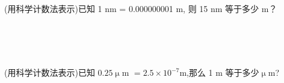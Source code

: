 \begin{comment}
    \item{
        化简: $(-a-b)^{2n}$ ($n$为整数).
    }
    \\ \\ \\
    \item{
        化简: $(-a-b)^{2n+1}$ ($n$为整数).
    }
    \\ \\ \\
\end{comment}

\item{
    (用科学计数法表示)已知 1 nm = 0.000000001 m, 则 15 nm 等于多少 m？
    \iffalse
    \fangsong\zihao{4}
    解答: 

    \textcircled{1} 写出换算关系
    \begin{align*}
        1 \rm{nm} &= 10^{-9} \rm{m}
    \end{align*}
    \textcircled{2} 两边同时乘15
    \begin{align*}
        15 \rm{nm} &= 15 \times 10^{-9} \rm{m}\\
        &= 1.5\times 10^{-8} \rm{m}.
    \end{align*}
    \fi
}
\\ \\ \\

\begin{comment}
    \item{
        (用科学计数法表示)肥皂泡表面厚度大约是 0.0007 mm,换算成以米为单位是多少？
        \iffalse
        \fangsong\zihao{4}
        解答: 

        \textcircled{1} 写出换算关系
        \begin{align*}
            1 \rm{mm} &= 10^{-3} \rm{m}
        \end{align*}
        \textcircled{2} 两边同时乘0.0007
        \begin{align*}
            0.0007 \rm{mm} &= 0.0007 \times 10^{-3} \rm{m}\\
            &= 7\times 10^{-7} \rm{m}.
        \end{align*}
        \fi
    }
    \\ \\ \\
\end{comment}

\item{
    (用科学计数法表示)已知 $0.25 \upmu$m $ = 2.5\times 10^{-7}$m,那么 1 m 等于多少$\upmu$m?
    \iffalse
    \fangsong\zihao{4}
    思路: 将题中给出的换算关系两边同时除以 $2.5\times 10^{-7}$,右边就出现了 1m.

    解答: 
    \begin{align*}
        \frac{0.25}{2.5\times 10^{-7}} \rm{\upmu m} &= 1\rm{m}\\
        10^6 \rm{\upmu m} &= 1\rm{m}\\
        1\rm{m} &= 10^6 \rm{\upmu m}.
    \end{align*}
    \fi
}
\\ \\ \\

